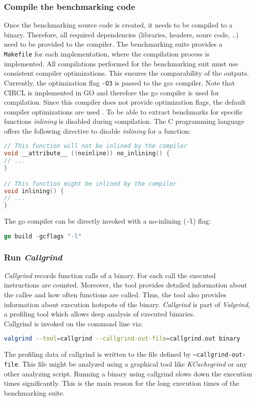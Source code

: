 \subsubsection{Compile the benchmarking code}
Once the benchmarking source code is created, it needs to be compiled to a binary. Therefore, all required dependencies (libraries, headers, sourc code, ..) need to be provided to the compiler. The benchmarking suite provides a \texttt{Makefile} for each implementation, where the compilation process is implemented.
All compilations performed for the benchmarking suit must use consistent compiler optimizations. This ensures the comparability of the outputs. Currently, the optimization flag \texttt{-O3} is passed to the gcc compiler. Note that CIRCL is implemented in GO and therefore the go compiler is used for compilation. Since this compiler does not provide optimization flags, the default compiler optimizations are used \parencite{gowiki2020compiler}.
To be able to extract benchmarks for specific functions \textit{inlining} is disabled during compilation. The C programming language offers the following directive to disable \textit{inlining} for a function:
\begin{lstlisting}[language=C]
// This function will not be inlined by the compiler
void __attribute__ ((noinline)) no_inlining() {
// ...
}

// This function might be inlined by the compiler
void inlining() {
// ...
}
\end{lstlisting}
The go compiler can be directly invoked with a no-inlining (\texttt{-l}) flag:
\begin{lstlisting}[language=Go]
go build -gcflags "-l"
\end{lstlisting}

\subsubsection{Run \textit{Callgrind}}
\textit{Callgrind} records function calls of a binary. For each call the executed instructions are counted. Moreover, the tool provides detailed information about the callee and how often functions are called. Thus, the tool also provides information about execution hotspots of the binary. \textit{Callgrind} is part of \textit{Valgrind}, a profiling tool which allows deep analysis of executed binaries.\\
Callgrind is invoked on the command line via:
\begin{lstlisting}[language=Bash]
valgrind --tool=callgrind --callgrind-out-file=callgrind.out binary
\end{lstlisting}
The profiling data of callgrind is written to the file defined by \texttt{--callgrind-out-file}. This file might be analyzed using a graphical tool like \textit{KCachegrind} or any other analyzing script.
Running a binary using callgrind slows down the execution times significantly. This is the main reason for the long execution times of the benchmarking suite. 

